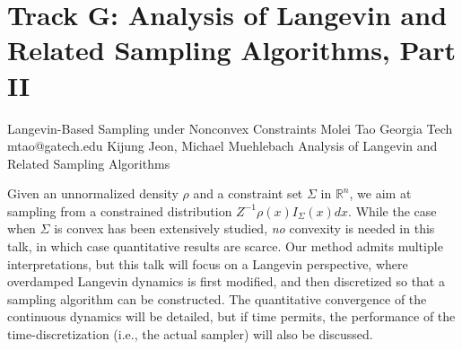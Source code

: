 \section{Track G: Analysis of Langevin and Related Sampling Algorithms, Part II}\newpage

\begin{talk}
{Langevin-Based Sampling under Nonconvex Constraints}
  {Molei Tao}%
  {Georgia Tech}%
  {mtao@gatech.edu}%
  {Kijung Jeon, Michael Muehlebach}%
  {Analysis of Langevin and Related Sampling Algorithms}%
    

Given an unnormalized density $\rho$ and a constraint set $\Sigma$ in $\mathbb{R}^n$, we aim at sampling from a constrained distribution $Z^{-1} \rho(x) I_{\Sigma}(x) dx$. While the case when $\Sigma$ is convex has been extensively studied, \emph{no} convexity is needed in this talk, in which case quantitative results are scarce. %
Our method admits multiple interpretations, but this talk will focus on a Langevin perspective, where overdamped Langevin dynamics is first modified, and then discretized so that a sampling algorithm can be constructed. The quantitative convergence of the continuous dynamics will be detailed, but if time permits, the performance of the time-discretization (i.e., the actual sampler) will also be discussed.





\end{talk}
